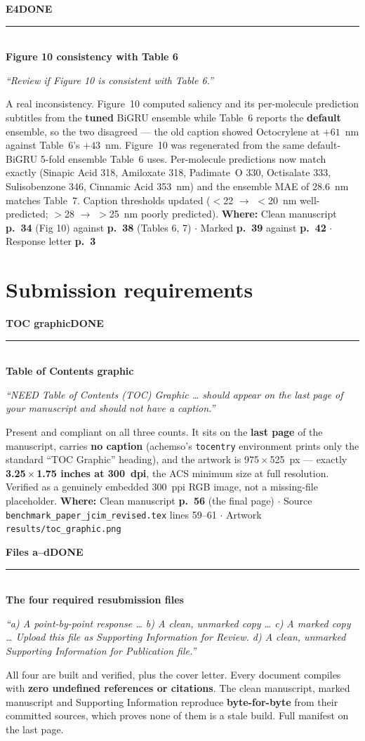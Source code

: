 \documentclass[11pt]{article}
\newcommand{\itemhead}[4]{%
  \needspace{4\baselineskip}%
  \vspace{0.5em}%
  {\bfseries\color{accent}#1}\hfill{\small\bfseries\color{#3}\MakeUppercase{#2}}\\[-0.4em]
  \textcolor{rulegrey}{\rule{\linewidth}{0.4pt}}\\[-0.2em]
  {\bfseries #4}\par\vspace{-0.15em}%
}
\newcommand{\quo}[1]{{\small\itshape\color{inkmute}``#1''}\par}
\newcommand{\where}[1]{%
  \vspace{0.15em}%
  {\small\textcolor{inkmute}{\textbf{Where:}} #1}\par
}
\begin{document}
\itemhead{E4}{done}{done}{Figure 10 consistency with Table 6}
\quo{Review if Figure 10 is consistent with Table 6.}
A real inconsistency. Figure~10 computed saliency and its per-molecule prediction subtitles from the
\textbf{tuned} BiGRU ensemble while Table~6 reports the \textbf{default} ensemble, so the two disagreed ---
the old caption showed Octocrylene at $+61$~nm against Table~6's $+43$~nm. Figure~10 was regenerated from
the same default-BiGRU 5-fold ensemble Table~6 uses. Per-molecule predictions now match exactly (Sinapic
Acid 318, Amiloxate 318, Padimate~O 330, Octisalate 333, Sulisobenzone 346, Cinnamic Acid 353~nm) and the
ensemble MAE of 28.6~nm matches Table~7. Caption thresholds updated
($<$22 $\rightarrow$ $<$20~nm well-predicted; $>$28 $\rightarrow$ $>$25~nm poorly predicted).
\where{Clean manuscript \textbf{p.~34} (Fig 10) against \textbf{p.~38} (Tables 6, 7) $\cdot$
Marked \textbf{p.~39} against \textbf{p.~42} $\cdot$ Response letter \textbf{p.~3}}

\section{Submission requirements}

\itemhead{TOC graphic}{done}{done}{Table of Contents graphic}
\quo{NEED Table of Contents (TOC) Graphic \ldots{} should appear on the last page of your manuscript and should not have a caption.}
Present and compliant on all three counts. It sits on the \textbf{last page} of the manuscript, carries
\textbf{no caption} (achemso's \texttt{tocentry} environment prints only the standard ``TOC Graphic''
heading), and the artwork is 975\,$\times$\,525~px --- exactly \textbf{3.25\,$\times$\,1.75 inches at
300~dpi}, the ACS minimum size at full resolution. Verified as a genuinely embedded 300~ppi RGB image,
not a missing-file placeholder.
\where{Clean manuscript \textbf{p.~56} (the final page) $\cdot$ Source
\texttt{benchmark\_paper\_jcim\_revised.tex} lines 59--61 $\cdot$ Artwork \texttt{results/toc\_graphic.png}}

\itemhead{Files a--d}{done}{done}{The four required resubmission files}
\quo{a) A point-by-point response \ldots{} b) A clean, unmarked copy \ldots{} c) A marked copy \ldots{} Upload this file as Supporting Information for Review. d) A clean, unmarked Supporting Information for Publication file.}
All four are built and verified, plus the cover letter. Every document compiles with \textbf{zero undefined
references or citations}. The clean manuscript, marked manuscript and Supporting Information reproduce
\textbf{byte-for-byte} from their committed sources, which proves none of them is a stale build. Full
manifest on the last page.
\end{document}
